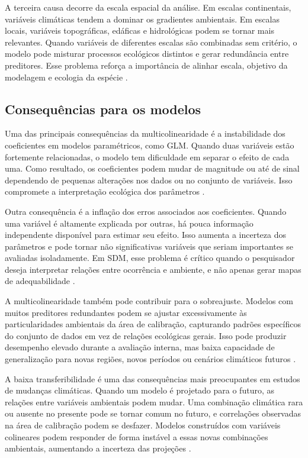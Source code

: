 A terceira causa decorre da escala espacial da análise. Em escalas continentais, variáveis climáticas tendem a dominar os gradientes ambientais. Em escalas locais, variáveis topográficas, edáficas e hidrológicas podem se tornar mais relevantes. Quando variáveis de diferentes escalas são combinadas sem critério, o modelo pode misturar processos ecológicos distintos e gerar redundância entre preditores. Esse problema reforça a importância de alinhar escala, objetivo da modelagem e ecologia da espécie \parencite{wiens1989spatial,elith2009species}.

\subsection{Consequências para os modelos}

Uma das principais consequências da multicolinearidade é a instabilidade dos coeficientes em modelos paramétricos, como GLM. Quando duas variáveis estão fortemente relacionadas, o modelo tem dificuldade em separar o efeito de cada uma. Como resultado, os coeficientes podem mudar de magnitude ou até de sinal dependendo de pequenas alterações nos dados ou no conjunto de variáveis. Isso compromete a interpretação ecológica dos parâmetros \parencite{dormann2013collinearity,franklin2010mapping}.

Outra consequência é a inflação dos erros associados aos coeficientes. Quando uma variável é altamente explicada por outras, há pouca informação independente disponível para estimar seu efeito. Isso aumenta a incerteza dos parâmetros e pode tornar não significativas variáveis que seriam importantes se avaliadas isoladamente. Em SDM, esse problema é crítico quando o pesquisador deseja interpretar relações entre ocorrência e ambiente, e não apenas gerar mapas de adequabilidade \parencite{guisan2017habitat,dormann2013collinearity}.

A multicolinearidade também pode contribuir para o sobreajuste. Modelos com muitos preditores redundantes podem se ajustar excessivamente às particularidades ambientais da área de calibração, capturando padrões específicos do conjunto de dados em vez de relações ecológicas gerais. Isso pode produzir desempenho elevado durante a avaliação interna, mas baixa capacidade de generalização para novas regiões, novos períodos ou cenários climáticos futuros \parencite{elith2009species,zurell2020standard}.

A baixa transferibilidade é uma das consequências mais preocupantes em estudos de mudanças climáticas. Quando um modelo é projetado para o futuro, as relações entre variáveis ambientais podem mudar. Uma combinação climática rara ou ausente no presente pode se tornar comum no futuro, e correlações observadas na área de calibração podem se desfazer. Modelos construídos com variáveis colineares podem responder de forma instável a essas novas combinações ambientais, aumentando a incerteza das projeções \parencite{araujo2005validation,thuiller2004effects}.

